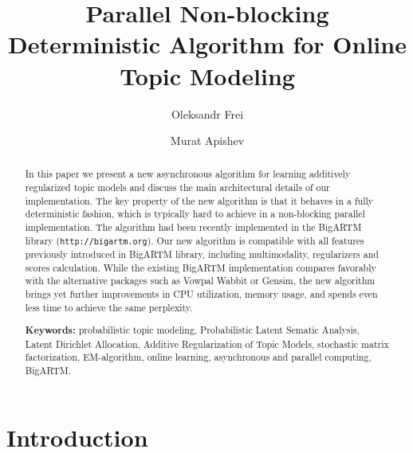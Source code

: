 \documentclass[russian,english]{llncs}
\begin{document}
\title{
    Parallel Non-blocking Deterministic Algorithm for Online Topic Modeling
}
\author{
    Oleksandr Frei
    \and
    Murat Apishev
}

\maketitle

\begin{abstract}
In this paper we present a new asynchronous algorithm for learning additively regularized topic models
and discuss the main architectural details of our implementation.
The key property of the new algorithm is that it behaves in a fully deterministic fashion,
which is typically hard to achieve in a non-blocking parallel implementation. The algorithm
had been
recently implemented in the BigARTM library (\texttt{http://bigartm.org}).
Our new algorithm is compatible with all features previously introduced in BigARTM library,
including multimodality, regularizers and scores calculation.
While the existing BigARTM implementation compares favorably
with the alternative packages such as Vowpal Wabbit or Gensim,
the new algorithm brings yet further improvements in CPU utilization,
memory usage, and spends even less time to achieve the same perplexity.

\vspace{1em}
\textbf{Keywords:}
    probabilistic topic modeling,
    Probabilistic Latent Sematic Analysis,
    Latent Dirichlet Allocation,
    Additive Regularization of Topic Models,
    stochastic matrix factorization,
    EM-algorithm,
    online learning,
    asynchronous and parallel computing,
    BigARTM.
\end{abstract}

\section{Introduction}
%
\end{document}
